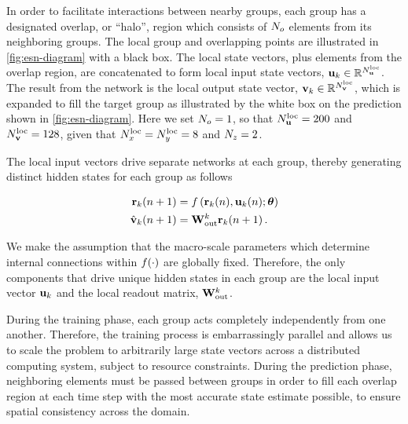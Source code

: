 In order to facilitate interactions between nearby groups, each group has a designated overlap, or ``halo'', region which consists of $N_{o}$ elements
from its neighboring groups.
The local group and overlapping points are illustrated in \cref{fig:esn-diagram}
with a black box.
The local state vectors, plus elements from the overlap region, are concatenated
to form local input state vectors,
$\mathbf{u}_{k}\in\mathbb{R}^{N_{\mathbf{u}}^\text{loc}}$.
The result from the network is the local output state vector,
$\mathbf{v}_{k}\in\mathbb{R}^{N_{\mathbf{v}}^\text{loc}}$,
which is expanded to fill the target group as illustrated by the
white box on the prediction shown in \cref{fig:esn-diagram}.
Here we set $N_{o}=1$, so that $N_{\mathbf{u}}^\text{loc}=200$ and
$N_{\mathbf{v}}^\text{loc}=128$, given that $N_{x}^\text{loc}=N_{y}^\text{loc}=8$ and $N_{z}=2$.

The local input vectors drive separate networks at each group, thereby generating distinct hidden states for each group as follows
\begin{linenomath*}\begin{equation}
    \begin{aligned}
        \mathbf{r}_{k}(n+1)
        &= f\left(
            \mathbf{r}_{k}(n), \mathbf{u}_{k}(n); \bm{\theta}
        \right) \\
        \hat{\mathbf{v}}_{k}(n+1)
        &= \mathbf{W}_\text{out}^{k} \mathbf{r}_{k}(n+1) \, .
    \end{aligned}
    \label{eq:local-rnn}
\end{equation}\end{linenomath*}
We make the assumption that the macro-scale parameters which determine internal
connections within $f(\cdot)$ are globally fixed.
Therefore, the only components
that drive unique hidden states in each group are the local input vector
$\mathbf{u}_{k}$ and the local readout matrix, $\mathbf{W}_\text{out}^{k}$.

During the training phase, each group acts completely independently from one
another.
Therefore, the training process is embarrassingly parallel and allows us to
scale the problem to arbitrarily large state vectors across a distributed
computing system, subject to resource constraints.
During the prediction phase, neighboring elements must be passed between
groups in order to fill each overlap region at each time step with the most accurate state estimate possible, to ensure spatial consistency across the domain.

